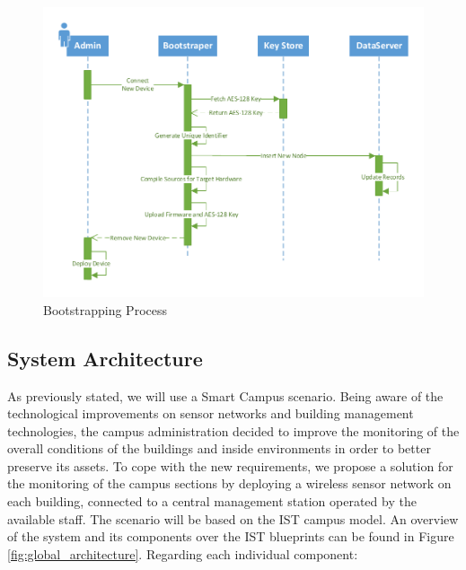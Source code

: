 \documentclass{llncs}
\begin{document}
\begin{figure}[h]
  \centering
  \includegraphics[width=1\linewidth]{figures/Sequence_Bootstrapping_Reviewed.pdf}
  \caption{Bootstrapping Process}
  \label{fig:bootstrapping_process}
\end{figure}

\subsection{System Architecture}
\label{sec:system_architecture}
As previously stated, we will use a Smart Campus scenario. 
Being aware of the technological improvements on sensor networks and building management technologies, the campus administration decided to improve the monitoring of the overall conditions of the buildings and inside environments in order to better preserve its assets. 
To cope with the new requirements, we propose a solution for the monitoring of the campus sections by deploying a wireless sensor network on each building, connected to a central management station operated by the available staff. 
The scenario will be based on the \ac{IST} campus model. An overview of the system and its components over the \ac{IST} blueprints can be found in Figure \ref{fig:global_architecture}. 
Regarding each individual component:
\end{document}
